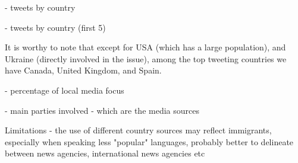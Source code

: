 \documentclass{acm_proc_10ptArticle-sp}
\begin{document}
- tweets by country

- tweets by country (first 5)

It is worthy to note that except for USA (which has a large population), and Ukraine (directly involved in the issue), among the top tweeting countries we have Canada, United Kingdom, and Spain. 

- percentage of local media focus

- main parties involved - which are the media sources

Limitations - the use of different country sources may reflect immigrants, especially when speaking less "popular" languages, probably better to delineate between news agencies, international news agencies etc




\end{document}
